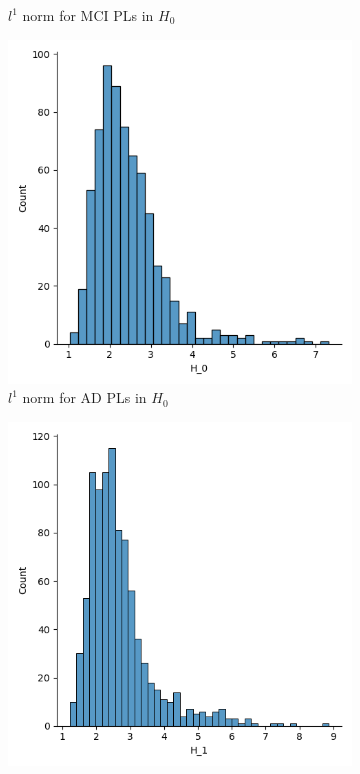 \documentclass{article}
\begin{document}
\begin{figure}
\begin{subfigure}{0.3\textwidth}
    \caption{$l^1$ norm for MCI PLs in $H_0$}
  \end{subfigure}
  \begin{subfigure}{0.3\textwidth}
    \includegraphics[width=\textwidth]{figures/average_pls/average_pl_AD_H_0.png}
    \caption{$l^1$ norm for AD PLs in $H_0$}
  \end{subfigure}
  \begin{subfigure}{0.3\textwidth}
    \includegraphics[width=\textwidth]{figures/average_pls/average_pl_CN_H_1.png}

\end{subfigure}
\end{figure}
\end{document}
